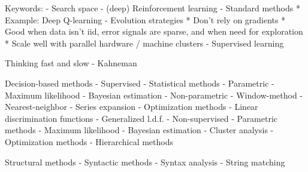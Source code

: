 Keywords:
- Search space
- (deep) Reinforcement learning
  - Standard methods
    * Example: Deep Q-learning
  - Evolution strategies
    * Don't rely on gradients
    * Good when data isn't iid, error signals are sparse, and when need for exploration
    * Scale well with parallel hardware / machine clusters
- Supervised learning

Thinking fast and slow - Kahneman


Decision-based methods
- Supervised
  - Statistical methods
    - Parametric
      - Maximum likelihood
      - Bayesian estimation
    - Non-parametric
      - Window-method
      - Nearest-neighbor
      - Series expansion
  - Optimization methods
    - Linear discrimination functions
    - Generalized l.d.f.
- Non-supervised
  - Parametric methods
    - Maximum likelihood
    - Bayesian estimation
  - Cluster analysis
    - Optimization methods
    - Hierarchical methods
    
Structural methods
  - Syntactic methods
    - Syntax analysis
    - String matching
    
    


\ifMonolithic\else\fi